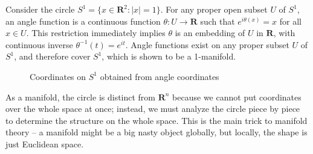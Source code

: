 \begin{example}
    Consider the circle $S^1 = \{ x \in \mathbf{R}^2 : |x| = 1 \}$. For any proper open subset $U$ of $S^1$, an angle function is a continuous function $\theta:U \to \mathbf{R}$ such that $e^{i\theta(x)} = x$ for all $x \in U$. This restriction immediately implies $\theta$ is an embedding of $U$ in $\mathbf{R}$, with continuous inverse $\theta^{-1}(t) = e^{it}$. Angle functions exist on any proper subset $U$ of $S^1$, and therefore cover $S^1$, which is shown to be a 1-manifold.
\end{example}

\begin{figure}
\begin{center}
\caption{Coordinates on $S^1$ obtained from angle coordinates}
\end{center}
\end{figure}

As a manifold, the circle is distinct from $\mathbf{R}^n$ because we cannot put coordinates over the whole space at once; instead, we must analyze the circle piece by piece to determine the structure on the whole space. This is the main trick to manifold theory -- a manifold might be a big nasty object globally, but locally, the shape is just Euclidean space.


